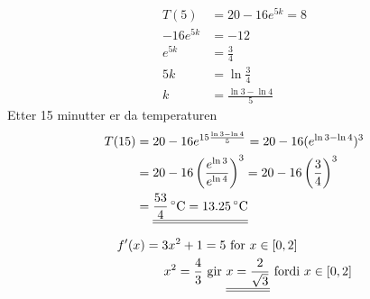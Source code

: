 \documentclass[a4paper,norsk,12pt]{article}
\begin{document}
\begin{align*}
  T(5) & = 20-16e^{5k} = 8 \\
  -16e^{5k} & = -12 \\
  e^{5k} & = \frac{3}{4} \\
  5k & = \ln\frac{3}{4} \\
  k & = \frac{\ln 3 - \ln 4}{5}
\end{align*}
Etter 15 minutter er da temperaturen
\begin{align*}
  T(15) & = 20 - 16e^{15\frac{\ln 3 - \ln 4}{5}}
          = 20 - 16(e^{\ln 3 - \ln 4})^3 \\
        & = 20 - 16\left( \frac{e^{\ln 3}}{e^{\ln 4}} \right)^3
          = 20 - 16\left(\frac{3}{4}\right)^3 \\
        & = \svar{\unit[\frac{53}{4}]{^\circ C} = \unit[13.25]{^\circ C}}
\end{align*}


\begin{align*}
  f'(x) = 3x^2 + 1 & = 5 \text{ for } x \in [0,2]\\
  x^2 = \frac{4}{3} & \text{ gir }
  \svar{x = \frac{2}{\sqrt{3}}} \text{ fordi } x \in [0,2]
\end{align*}
\end{document}
